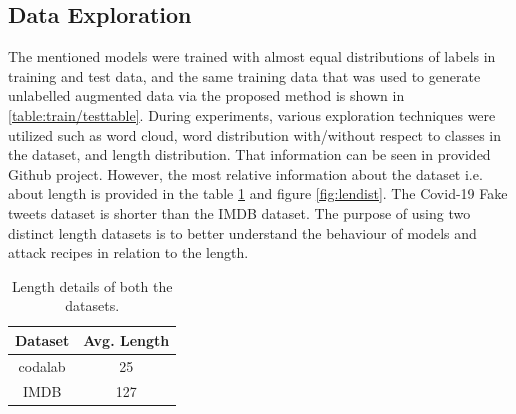 \documentclass[%
	BCOR=8mm, %
	DIV=12,
	toc=bibliography, %
	toc=listof, %
	oneside, %
	egregdoesnotlikesansseriftitles, %
	]{scrbook}
\begin{document}
\subsection{Data Exploration}
\label{subsection:dataexploration}
The mentioned models were trained with almost equal distributions of labels in training and test data, and the same training data that was used to generate unlabelled augmented data via the proposed method is shown in \ref{table:train/testtable}. During experiments, various exploration techniques were utilized such as word cloud, word distribution with/without respect to classes in the dataset, and length distribution. That information can be seen in provided Github project. However, the most relative information about the dataset i.e. about length is provided in the table \ref{table:Length stat } and figure \ref{fig:lendist}.
The Covid-19 Fake tweets dataset is shorter than the IMDB dataset. The purpose of using two distinct length datasets is to better understand the behaviour of models and attack recipes in relation to the length.
\begin{table}[!h]
\centering
\begin{tabular}{ |c|c| }
\hline
Dataset &  Avg. Length  \\
\hline
codalab & 25  \\
IMDB & 127  \\
\hline
\end{tabular}
\caption[Length details of datasets]{Length details of both the datasets.}
\label{table:Length stat }
\end{table}
\end{document}
